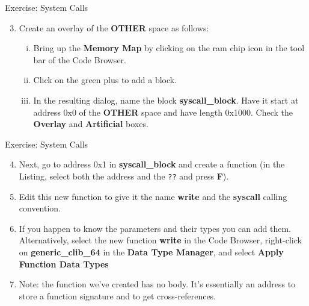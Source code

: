 \documentclass{beamer}
\begin{document}
\begin{frame}
\begin{block}{Exercise: System Calls}
\begin{enumerate}
\setcounter{enumi}{2}
\item Create an overlay of the \textbf{OTHER} space as follows:
\begin{enumerate}[(i)]
\item Bring up the \textbf{Memory Map} by clicking on the ram chip icon in the tool bar of the Code Browser.
\item Click on the green plus to add a block.
\item In the resulting dialog, name the block \textbf{syscall\_block}.  Have it start at address 0x0 of the \textbf{OTHER} space and have length 0x1000.
Check the \textbf{Overlay} and \textbf{Artificial} boxes. 
\end{enumerate}
\end{enumerate}
\end{block}
\end{frame}

\begin{frame}
\begin{block}{Exercise: System Calls}
\begin{enumerate}
\setcounter{enumi}{3}
\item Next, go to address 0x1 in \textbf{syscall\_block} and create a function (in the Listing, select both the address and the \texttt{??} and press \textbf{F}).
\item Edit this new function to give it the name \textbf{write} and the \textbf{syscall} calling convention.
\item If you happen to know the parameters and their types you can add them.  Alternatively, select the new function \textbf{write} in the Code Browser, right-click on 
\textbf{generic\_clib\_64} in the \textbf{Data Type Manager}, and select \textbf{Apply Function Data Types}
\item[] Note: the function we've created has no body. It's essentially an address to store a function signature and to get cross-references.
\end{enumerate}
\end{block}
\end{frame}
\end{document}
